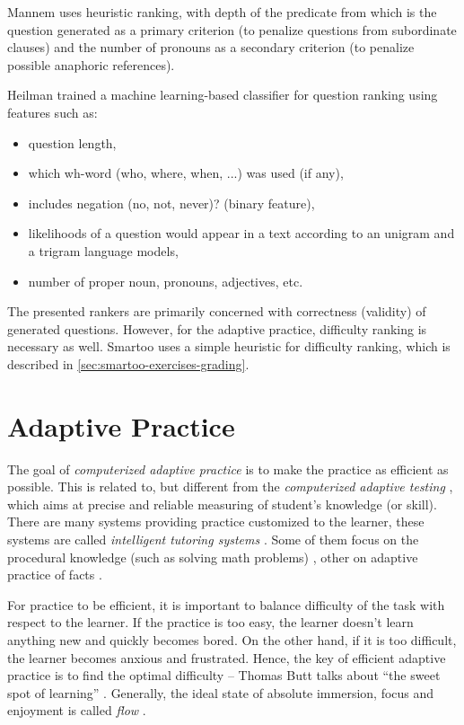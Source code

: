 \documentclass[12pt, twoside]{fithesis2}
\renewcommand{\_}{\leavevmode \kern0.07em\vbox{\hrule width0.4em}}
\newcommand{\squarebullet}{\textcolor{black}{\raisebox{0.15em}{\rule{4pt}{4pt}}}}
\newcommand{\emptysquarebullet}{\textcolor{black}{\raisebox{0.10em}{\tiny$\square$}}}
\newenvironment{myItemize}{
  \begin{itemize}[leftmargin=2em,rightmargin=1em,itemsep=\parskip ,parsep=0em,topsep=0em,partopsep=0em]
  \renewcommand{\labelitemi}{\squarebullet}
  \renewcommand{\labelitemii}{\textbullet}
}{
  \end{itemize}
}
\begin{document}
Mannem \cite{question-gen-mannem} uses heuristic ranking,
with depth of the predicate from which is the question generated as a primary criterion
(to penalize questions from subordinate clauses)
and the number of pronouns as a secondary criterion (to penalize possible anaphoric references).

Heilman \cite{question-gen-heilman} trained a machine learning-based classifier for question ranking using features such as:
\begin{myItemize}
\item question length,
\item which wh-word (who, where, when, ...) was used (if any),
\item includes negation (no, not, never)? (binary feature),
\item likelihoods of a question would appear in a text according to an unigram and a trigram language models,
\item number of proper noun, pronouns, adjectives, etc.
\end{myItemize}

The presented rankers are primarily concerned with correctness (validity) of generated questions.
However, for the adaptive practice, difficulty ranking is necessary as well.
Smartoo uses a simple heuristic for difficulty ranking, which is described in \autoref{sec:smartoo-exercises-grading}.


\chapter{Adaptive Practice}
\label{chap:practice}

The goal of \emph{computerized adaptive practice} \cite{adaptive-practice-irt-math}
is to make the practice as efficient as possible.
This is related to, but different from the \emph{computerized adaptive testing} \cite{computerized-adaptive-testing},
which aims at precise and reliable measuring of student's knowledge (or skill).
There are many systems providing practice customized to the learner,
these systems are called \emph{intelligent tutoring systems} \cite{tutoring-systems-behavior}.
Some of them focus on the procedural knowledge (such as solving math problems) \cite{adaptive-practice-irt-math},
other on adaptive practice of facts \cite{slepe-mapy}.

For practice to be efficient, it is important to balance difficulty of the task with respect to the learner.
If the practice is too easy, the learner doesn't learn anything new and quickly becomes bored.
On the other hand, if it is too difficult, the learner becomes anxious and frustrated.
Hence, the key of efficient adaptive practice is to find the optimal difficulty --
Thomas Butt talks about ``the sweet spot of learning'' \cite{adaptive-practice}.
Generally, the ideal state of absolute immersion, focus and enjoyment is called \emph{flow} \cite{flow}.
\end{document}
